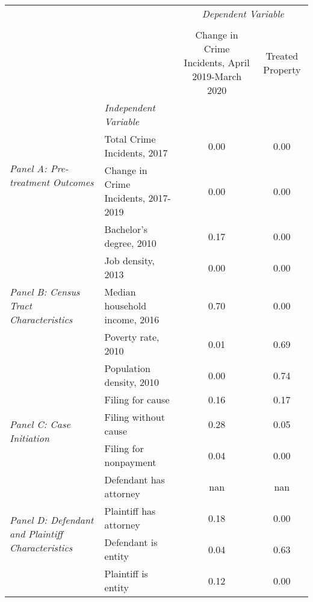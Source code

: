 \begin{tabular}{llcc}
\toprule
 &  & \multicolumn{2}{c}{\textit{Dependent Variable}} \\
\cline{3-4}
\\
 &  & Change in Crime Incidents, April 2019-March 2020 & Treated Property \\
 & \emph{Independent Variable} &  &  \\
\midrule
\multirow[c]{2}{3cm}{\textit{Panel A: Pre-treatment Outcomes}} & Total Crime Incidents, 2017 & 0.00 & 0.00 \\
 & Change in Crime Incidents, 2017-2019 & 0.00 & 0.00 \\
\cline{1-4}
\multirow[c]{5}{3cm}{\textit{Panel B: Census Tract Characteristics}} & Bachelor's degree, 2010 & 0.17 & 0.00 \\
 & Job density, 2013 & 0.00 & 0.00 \\
 & Median household income, 2016 & 0.70 & 0.00 \\
 & Poverty rate, 2010 & 0.01 & 0.69 \\
 & Population density, 2010 & 0.00 & 0.74 \\
\cline{1-4}
\multirow[c]{3}{3cm}{\textit{Panel C: Case Initiation}} & Filing for cause & 0.16 & 0.17 \\
 & Filing without cause & 0.28 & 0.05 \\
 & Filing for nonpayment & 0.04 & 0.00 \\
\cline{1-4}
\multirow[c]{4}{3cm}{\textit{Panel D: Defendant and Plaintiff Characteristics}} & Defendant has attorney & nan & nan \\
 & Plaintiff has attorney & 0.18 & 0.00 \\
 & Defendant is entity & 0.04 & 0.63 \\
 & Plaintiff is entity & 0.12 & 0.00 \\
\cline{1-4}
\bottomrule
\end{tabular}
